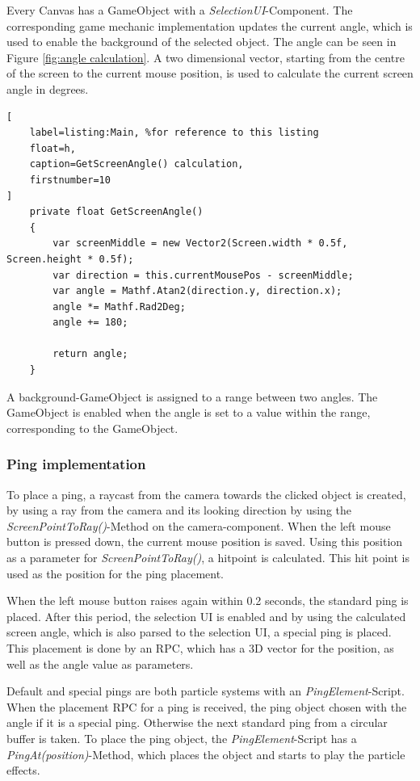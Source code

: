 Every Canvas has a GameObject with a \textit{SelectionUI}-Component. The corresponding game mechanic implementation updates the current angle, which is used to enable the background of the selected object. The angle can be seen in Figure \ref{fig:angle calculation}. A two dimensional vector, starting from the centre of the screen to the current mouse position, is used to calculate the current screen angle in degrees.

\begin{lstlisting}[
	label=listing:Main, %for reference to this listing
	float=h,
	caption=GetScreenAngle() calculation,
	firstnumber=10
]
    private float GetScreenAngle()
    {
        var screenMiddle = new Vector2(Screen.width * 0.5f, Screen.height * 0.5f);
        var direction = this.currentMousePos - screenMiddle;
        var angle = Mathf.Atan2(direction.y, direction.x);
        angle *= Mathf.Rad2Deg;
        angle += 180;

        return angle;
    }
\end{lstlisting}

A background-GameObject is assigned to a range between two angles. The GameObject is enabled when the angle is set to a value within the range, corresponding to the GameObject.



\subsubsection{Ping implementation}

To place a ping, a raycast from the camera towards the clicked object is created, by using a ray from the camera and its looking direction by using the \textit{ScreenPointToRay()}-Method on the camera-component. When the left mouse button is pressed down, the current mouse position is saved. Using this position as a parameter for \textit{ScreenPointToRay()}, a hitpoint is calculated. This hit point is used as the position for the ping placement.

When the left mouse button raises again within 0.2 seconds, the standard ping is placed. After this period, the selection UI is enabled and by using the calculated screen angle, which is also parsed to the selection UI, a special ping is placed. This placement is done by an RPC, which has a 3D vector for the position, as well as the angle value as parameters.

Default and special pings are both particle systems with an \textit{PingElement}-Script.
When the placement RPC for a ping is received, the ping object chosen with the angle if it is a special ping. Otherwise the next standard ping from a circular buffer is taken. To place the ping object, the \textit{PingElement}-Script has a \textit{PingAt(position)}-Method, which places the object and starts to play the particle effects.


